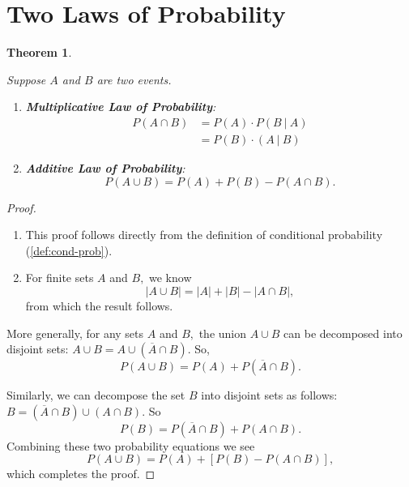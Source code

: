 \documentclass[
]{book}
\newtheorem{theorem}{Theorem}[chapter]
\theoremstyle{definition}
\theoremstyle{definition}
\theoremstyle{definition}
\theoremstyle{definition}
\theoremstyle{remark}
\begin{document}
\section{Two Laws of Probability}\label{two-laws-of-probability}

\begin{theorem}
\protect\hypertarget{thm:two-prob-laws}{}\label{thm:two-prob-laws}

Suppose \(A\) and \(B\) are two events.

\begin{enumerate}
\def\labelenumi{\arabic{enumi}.}
\item
  \textbf{Multiplicative Law of Probability}:
  \begin{align*}
    P(A \cap B) &= P(A)\cdot P(B~|~A) \\
             &= P(B) \cdot (A~|~B) 
    \end{align*}
\item
  \textbf{Additive Law of Probability}:
  \[P(A\cup B) = P(A) + P(B) - P(A \cap B).\]
\end{enumerate}

\end{theorem}

\begin{proof}
\leavevmode

\begin{enumerate}
\def\labelenumi{\arabic{enumi}.}
\item
  This proof follows directly from the definition of conditional probability (\ref{def:cond-prob}).
\item
  For finite sets \(A\) and \(B,\) we know \[|A \cup B| = |A| + |B| - |A \cap B|,\] from which the result follows.
\end{enumerate}

More generally, for any sets \(A\) and \(B,\) the union \(A \cup B\) can be decomposed into disjoint sets: \(A \cup B = A \cup (\overline{A} \cap B).\)
So, \[P(A \cup B) = P(A) + P(\overline{A} \cap B).\]

Similarly, we can decompose the set \(B\) into disjoint sets as follows: \(B = (\overline{A} \cap B) \cup (A \cap B).\)
So \[P(B) = P(\overline{A}\cap B) + P(A \cap B).\]
Combining these two probability equations we see \[P(A \cup B) = P(A) + \left[P(B)-P(A\cap B)\right],\] which completes the proof.

\end{proof}
\end{document}
